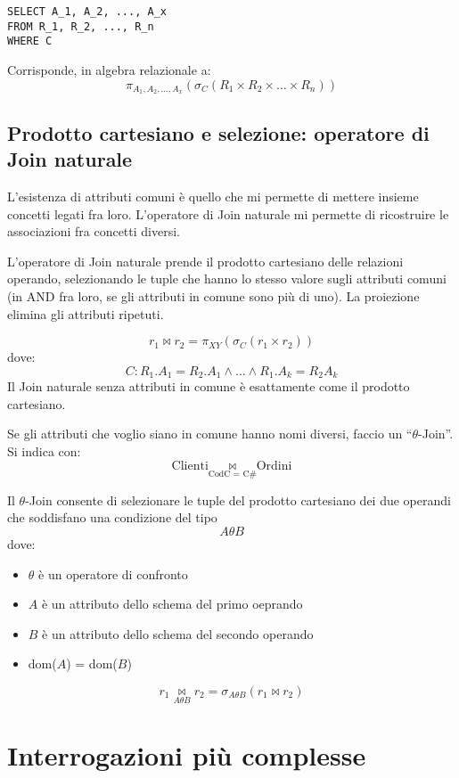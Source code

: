\begin{lstlisting}
SELECT A_1, A_2, ..., A_x
FROM R_1, R_2, ..., R_n
WHERE C
\end{lstlisting}

Corrisponde, in algebra relazionale a: 
\[
\pi_{A_1, A_2, \dots, A_x} \left( \sigma_{C} \left( R_1 \times R_2 \times \dots \times R_n \right) \right)
\]

\subsection{Prodotto cartesiano e selezione: operatore di Join naturale}

L'esistenza di attributi comuni \`e quello che mi permette di mettere insieme concetti legati fra loro. L'operatore di Join naturale mi permette di ricostruire le associazioni fra concetti diversi.

L'operatore di Join naturale prende il prodotto cartesiano delle relazioni operando, selezionando le tuple che hanno lo stesso valore sugli attributi comuni (in AND fra loro, se gli attributi in comune sono pi\`u di uno). La proiezione elimina gli attributi ripetuti.

\[
r_1 \Join r_2 = \pi_{XY} \left( \sigma_{C} \left( r_1 \times r_2 \right) \right)
\]
dove:
\[
C: R_1 . A_1 = R_2 . A_1 \land \dots \land R_1 . A_k = R_2 A_k
\]
Il Join naturale senza attributi in comune \`e esattamente come il prodotto cartesiano.

Se gli attributi che voglio siano in comune hanno nomi diversi, faccio un ``$\theta$-Join''. Si indica con:
\[
\text{Clienti} \underset{\text{CodC } = \text{ C\#}}{\Join} \text{Ordini}
\]

Il $\theta$-Join consente di selezionare le tuple del prodotto cartesiano dei due operandi che soddisfano una condizione del tipo 
\[
A \theta B
\]
dove:
\begin{itemize}
    \item $\theta$ \`e un operatore di confronto
    \item $A$ \`e un attributo dello schema del primo oeprando
    \item $B$ \`e un attributo dello schema del secondo operando
    \item dom($A$) = dom($B$)
\end{itemize}
\[
r_1 \underset{A \theta B}{\Join} r_2 = \sigma_{A \theta B} \left( r_1 \Join r_2 \right)
\]

\section{Interrogazioni pi\`u complesse}

